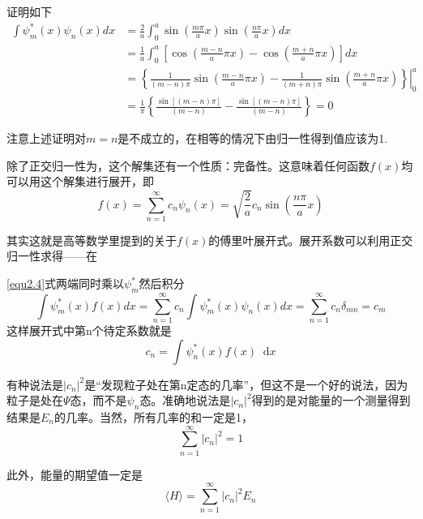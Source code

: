 \documentclass[UTF8]{ctexart}
\newcommand*{\dif}{\mathop{}\!\mathrm{d}}
\begin{document}
    证明如下
    \begin{equation}
    \begin{aligned} 
        \int \psi_{m}^{*}(x) \psi_{n}(x) d x &=\frac{2}{a} \int_{0}^{a} \sin \left(\frac{m \pi}{a} x\right) \sin \left(\frac{n \pi}{a} x\right) d x \\ 
        &=\frac{1}{a} \int_{0}^{a}\left[\cos \left(\frac{m-n}{a} \pi x\right)-\cos \left(\frac{m+n}{a} \pi x\right)\right] d x \\ 
        &=\left.\left\{\frac{1}{(m-n) \pi} \sin \left(\frac{m-n}{a} \pi x\right)-\frac{1}{(m+n) \pi} \sin \left(\frac{m+n}{a} \pi x\right)\right\}\right|_{0} ^{a} \\ 
        &=\frac{1}{\pi}\left\{\frac{\sin [(m-n) \pi]}{(m-n)}-\frac{\sin [(m-n) \pi]}{(m-n)}\right\}=0
    \end{aligned}
    \end{equation}

\noindent 注意上述证明对$m=n$是不成立的，在相等的情况下由归一性得到值应该为1.

    除了正交归一性为，这个解集还有一个性质：完备性。这意味着任何函数$f(x)$均可以用这个解集进行展开，即
    \begin{equation}
        f(x) = \sum_{n=1}^{\infty} c_n \psi_n(x) = \sqrt{\frac{2}{a}}c_n \sin(\frac{n \pi}{a} x) \label{equ2.4}
    \end{equation}

\noindent 其实这就是高等数学里提到的关于$f(x)$的傅里叶展开式。展开系数可以利用正交归一性求得——在

\noindent \autoref{equ2.4}式两端同时乘以$\psi_m^*$然后积分
\begin{equation}
    \int \psi_{m}^{*}(x) f(x) d x=\sum_{n=1}^{\infty} c_{n} \int \psi_{m}^{*}(x) \psi_{n}(x) d x=\sum_{n=1}^{\infty} c_{n} \delta_{m n}=c_{m}
    \end{equation}
\noindent 这样展开式中第n个待定系数就是
\begin{equation}
    c_n = \int \psi_n^*(x) f(x) \dif x
\end{equation}

    有种说法是$|c_n|^2$是“发现粒子处在第n定态的几率”，但这不是一个好的说法，因为粒子是处在$\Psi$态，而不是$\psi_n$态。准确地说法是$|c_n|^2$得到的是对能量的一个测量得到结果是$E_n$的几率。当然，所有几率的和一定是1，
    \begin{equation}
        \sum_{n=1}^{\infty} |c_n|^2 = 1
    \end{equation}

    此外，能量的期望值一定是
    \begin{equation}
        \langle H \rangle = \sum_{n=1}^{\infty} |c_n|^2 E_n
    \end{equation}
\end{document}
